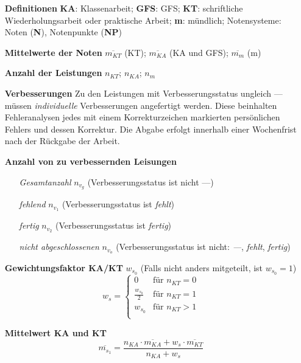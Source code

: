\documentclass{article}
\begin{document}
\begin{enumerate}[label=\textbf{\textbullet}, align=left, leftmargin=*]
	\item[\textbf{Definitionen}] \textbf{KA}: Klassenarbeit; \textbf{GFS}: GFS; \textbf{KT}: schriftliche Wiederholungsarbeit oder praktische Arbeit; \textbf{m}: mündlich; Notensysteme: Noten (\textbf{N}), Notenpunkte (\textbf{NP})
	\item[\textbf{Mittelwerte der Noten}] $\overline{m_{KT}}$ (KT); $\overline{m_{KA}}$ (KA und GFS); $\overline{m_{m}}$ (m)
	\item[\textbf{Anzahl der Leistungen}] $n_{KT}$; $n_{KA}$; $n_{m}$
	\item[\textbf{Verbesserungen}] Zu den Leistungen mit Verbesserungsstatus ungleich \glqq ---\grqq{} müssen \textit{individuelle} Verbesserungen angefertigt werden. Diese beinhalten Fehleranalysen jedes mit einem Korrekturzeichen markierten persönlichen Fehlers und dessen Korrektur. Die Abgabe erfolgt innerhalb einer Wochenfrist nach der Rückgabe der Arbeit.
	\item[\textbf{Anzahl von zu verbessernden Leisungen}] \mbox{} \
	\begin{enumerate}[label=\textbf{\textbullet}, align=left, leftmargin=*]
		\item[\textit{Gesamtanzahl}] $n_{v_g}$ (Verbesserungsstatus ist nicht \glqq ---\grqq{})
		\item[\textit{fehlend}] $n_{v_1}$ (Verbesserungsstatus ist \glqq \textit{fehlt}\grqq{})
		\item[\textit{fertig}] $n_{v_2}$ (Verbesserungsstatus ist \glqq \textit{fertig}\grqq{})
		\item[\textit{nicht abgeschlossenen}] $n_{v_o}$ (Verbesserungsstatus ist nicht: \glqq\textit{---}\grqq{}, \glqq\textit{fehlt}\grqq{}, \glqq\textit{fertig}\grqq{})
	\end{enumerate}
	\item[\textbf{Gewichtungsfaktor KA/KT}] $w_{s_0}$ (Falls nicht anders mitgeteilt, ist $w_{s_0}=1$)
	\[
	w_s =
	\begin{cases}
		0 & \text{für }  n_{KT} = 0 \\
		\frac{w_{s_0}}{2} & \text{für }    n_{KT} = 1 \\
		w_{s_0} & \text{für }    n_{KT} > 1 \\
	\end{cases}
	\]	
	\item[\textbf{Mittelwert KA und KT}] 
	\[
	\overline{m_{s_1}} = \frac{ n_{KA} \cdot \overline{m_{KA}} + w_s \cdot \overline{m_{KT}} }{n_{KA} + w_s}
\]
\end{enumerate}
\end{document}
